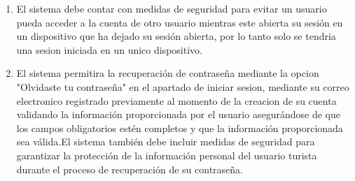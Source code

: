 \documentclass{article}
\begin{document}
\begin{enumerate}
    \item El sistema debe contar con medidas de seguridad para evitar un usuario pueda acceder a la cuenta de otro usuario mientras este abierta su sesión en un dispositivo que ha dejado su sesión abierta, por lo tanto solo se tendria una sesion iniciada en un unico dispositivo.
    

\item  El sistema permitira la recuperación de contraseña mediante la opcion "Olvidaste tu contraseña" en el apartado de iniciar sesion, mediante su correo electronico registrado previamente al momento de la creacion de su cuenta validando la información proporcionada por el usuario asegurándose de que los campos obligatorios estén completos y que la información proporcionada sea válida.El sistema también debe incluir medidas de seguridad para garantizar la protección de la información personal del usuario turista durante el proceso de recuperación de su contraseña.
\end{enumerate}
\end{document}
